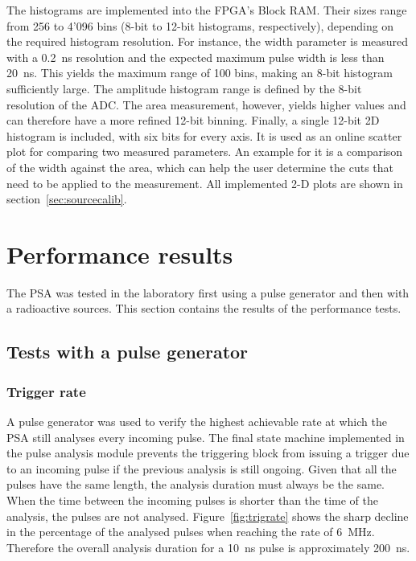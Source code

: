 The histograms are implemented into the FPGA's Block RAM. Their sizes range from 256 to 4'096 bins (8-bit to 12-bit histograms, respectively), depending on the required histogram resolution. For instance, the width parameter is measured with a 0.2~ns resolution and the expected maximum pulse width is less than 20~ns. This yields the maximum range of 100 bins, making an 8-bit histogram sufficiently large. The amplitude histogram range is defined by the 8-bit resolution of the ADC. The area measurement, however, yields higher values and can therefore have a more refined 12-bit binning. Finally, a single 12-bit 2D histogram is included, with six bits for every axis. It is used as an online scatter plot for comparing two measured parameters. An example for it is a comparison of the width against the area, which can help the user determine the cuts that need to be applied to the measurement. All implemented 2-D plots are shown in section~\ref{sec:sourcecalib}.




























\section{Performance results}
\label{sec:perres}
The PSA was tested in the laboratory first using a pulse generator and then with a radioactive sources. This section contains the results of the performance tests.

\subsection{Tests with a pulse generator}
\subsubsection{Trigger rate}
A pulse generator was used to verify the highest achievable rate at which the PSA still analyses every incoming pulse. The final state machine implemented in the pulse analysis module prevents the triggering block from issuing a trigger due to an incoming pulse if the previous analysis is still ongoing. Given that all the pulses have the same length, the analysis duration must always be the same. When the time between the incoming pulses is shorter than the time of the analysis, the pulses are not analysed. Figure~\ref{fig:trigrate} shows the sharp decline in the percentage of the analysed pulses when reaching the rate of 6~MHz. Therefore the overall analysis duration for a 10~ns pulse is approximately 200~ns.

